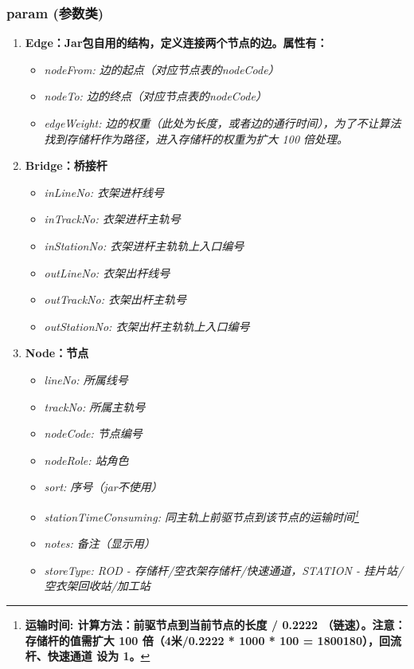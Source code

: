 \subsubsection{param (参数类)}
	\begin{enumerate}[label=\arabic*)]
		\item \bf{Edge}：Jar包自用的结构，定义连接两个节点的边。属性有：\label{sec:param-edge}
		\begin{itemize}
			\item \it{nodeFrom}: 边的起点（对应节点表的nodeCode）
			\item \it{nodeTo}: 边的终点（对应节点表的nodeCode） 
			\item \it{edgeWeight}: 边的权重（此处为长度，或者边的通行时间），为了不让算法找到存储杆作为路径，进入存储杆的权重为扩大 100 倍处理。
		\end{itemize}
		\item \bf{Bridge}：桥接杆\label{sec:param-bridge}
		\begin{itemize}
			\item \it{inLineNo}: 衣架进杆线号
			\item \it{inTrackNo}: 衣架进杆主轨号
			\item \it{inStationNo}: 衣架进杆主轨轨上入口编号
			\item \it{outLineNo}: 衣架出杆线号
			\item \it{outTrackNo}: 衣架出杆主轨号
			\item \it{outStationNo}: 衣架出杆主轨轨上入口编号 
		\end{itemize}
		\item \bf{Node}：节点\label{sec:param-node}
		\begin{itemize}
			\item \it{lineNo}: 所属线号
			\item \it{trackNo}: 所属主轨号
			\item \it{nodeCode}: 节点编号
			\item \it{nodeRole}: 站角色
			\item \it{sort}: 序号（jar不使用）
			\item \it{stationTimeConsuming}: 同主轨上前驱节点到该节点的运输时间\footnote{\bf{运输时间}: 计算方法：前驱节点到当前节点的长度 / 0.2222 （链速）。\bf{注意}：存储杆的值需扩大 100 倍（4米/0.2222 * 1000 * 100 = 1800180），回流杆、快速通道 设为 1。}
			\item \it{notes}: 备注（显示用）
			\item \it{storeType}: ROD - 存储杆/空衣架存储杆/快速通道，STATION - 挂片站/空衣架回收站/加工站

\end{itemize}
\end{enumerate}
